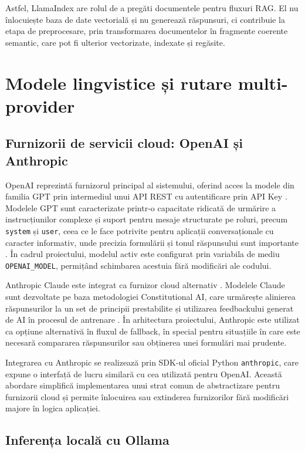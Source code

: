 \documentclass[12pt, a4paper, oneside, romanian]{teza-upb}
\begin{document}
Astfel, LlamaIndex are rolul de a pregăti documentele pentru fluxuri RAG. El nu înlocuiește baza de date vectorială și nu generează răspunsuri, ci contribuie la etapa de preprocesare, prin transformarea documentelor în fragmente coerente semantic, care pot fi ulterior vectorizate, indexate și regăsite.


\section{Modele lingvistice și rutare multi-provider}


\subsection{Furnizorii de servicii cloud: OpenAI și Anthropic}

OpenAI reprezintă furnizorul principal al sistemului, oferind acces la modele 
din familia GPT prin intermediul unui API REST cu autentificare prin API Key
\cite{openai_api}. Modelele GPT sunt caracterizate printr-o capacitate ridicată 
de urmărire a instrucțiunilor complexe și suport pentru mesaje structurate pe roluri, precum \texttt{system} și \texttt{user}, ceea ce le face potrivite pentru aplicații conversaționale cu caracter informativ, unde precizia formulării și tonul răspunsului sunt importante 
\cite{openai_api}. În cadrul proiectului, modelul activ este configurat prin 
variabila de mediu \texttt{OPENAI\_MODEL}, permițând schimbarea acestuia fără 
modificări ale codului.

  
Anthropic Claude este integrat ca furnizor cloud alternativ \cite{anthropic_claude}. Modelele Claude sunt dezvoltate pe baza metodologiei Constitutional AI, care urmărește alinierea răspunsurilor la un set de principii prestabilite și utilizarea feedbackului generat de AI în procesul de antrenare \cite{bai2022constitutional}. În arhitectura proiectului, Anthropic este utilizat ca opțiune alternativă în fluxul de fallback, în special pentru situațiile în care este necesară compararea răspunsurilor sau obținerea unei formulări mai prudente.

Integrarea cu Anthropic se realizează prin SDK-ul oficial Python \texttt{anthropic}, care expune o interfață de lucru similară cu cea utilizată pentru OpenAI. Această abordare simplifică implementarea unui strat comun de abstractizare pentru furnizorii cloud și permite înlocuirea sau extinderea furnizorilor fără modificări majore în logica aplicației.

\subsection{Inferența locală cu Ollama}
\end{document}
